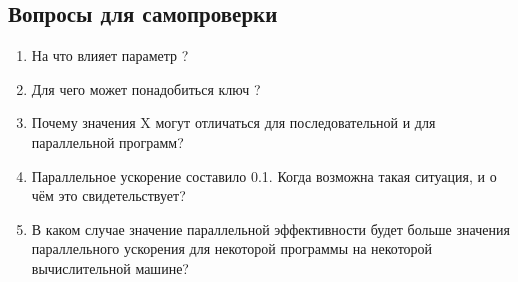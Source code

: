 \subsection{Вопросы для самопроверки}
\begin{enumerate}
    \item На что влияет параметр ?
    \item Для чего может понадобиться ключ ?
    \item Почему значения X могут отличаться для последовательной и для параллельной программ?
    \item Параллельное ускорение составило 0.1. Когда возможна такая ситуация, и о чём это свидетельствует?
    \item В каком случае значение параллельной эффективности будет больше значения параллельного ускорения для некоторой программы на некоторой вычислительной машине?
\end{enumerate}
